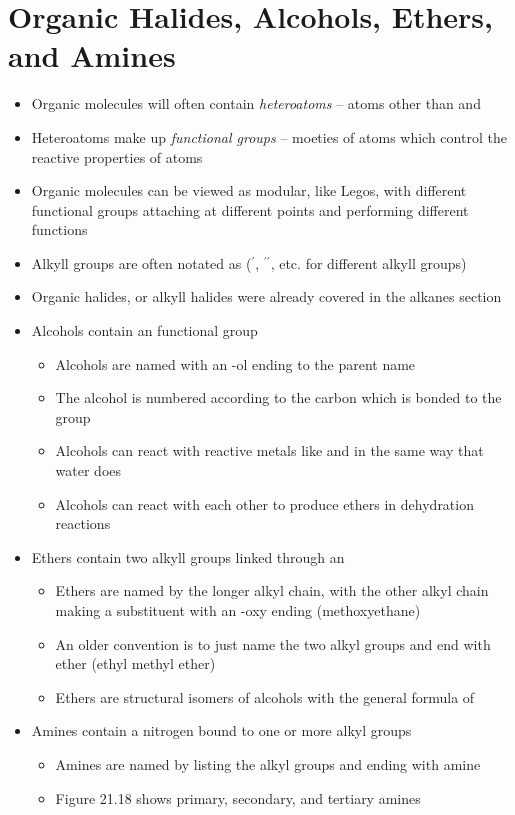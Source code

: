 \documentclass[12pt, openany, letterpaper]{memoir}
\begin{document}
\section{Organic Halides, Alcohols, Ethers, and Amines}
\begin{itemize}
	\item Organic molecules will often contain \emph{heteroatoms} -- atoms other than  and 
	\item Heteroatoms make up \emph{functional groups} -- moeties of atoms which control the reactive properties of atoms
	\item Organic molecules can be viewed as modular, like Legos, with different functional groups attaching at different points and performing different functions
	\item Alkyll groups are often notated as  ($^\prime$,  $^{\prime\prime}$, etc. for different alkyll groups)
	\item Organic halides, or alkyll halides were already covered in the alkanes section
	\item Alcohols contain an  functional group
	\begin{itemize}
		\item Alcohols are named with an -ol ending to the parent name
		\item The alcohol is numbered according to the carbon which is bonded to the  group
		\item Alcohols can react with reactive metals like  and  in the same way that water does
		\item Alcohols can react with each other to produce ethers in dehydration reactions
		
	\end{itemize}
	\item Ethers contain two alkyll groups linked through an 
	\begin{itemize}
		\item Ethers are named by the longer alkyl chain, with the other alkyl chain making a substituent with an -oxy ending (methoxyethane)
		\item An older convention is to just name the two alkyl groups and end with ether (ethyl methyl ether)
		\item Ethers are structural isomers of alcohols with the general formula of 
	\end{itemize}
	\item Amines contain a nitrogen bound to one or more alkyl groups
	\begin{itemize}
		\item Amines are named by listing the alkyl groups and ending with amine
		\item Figure 21.18 shows primary, secondary, and tertiary amines
	\end{itemize}
\end{itemize}
\end{document}
